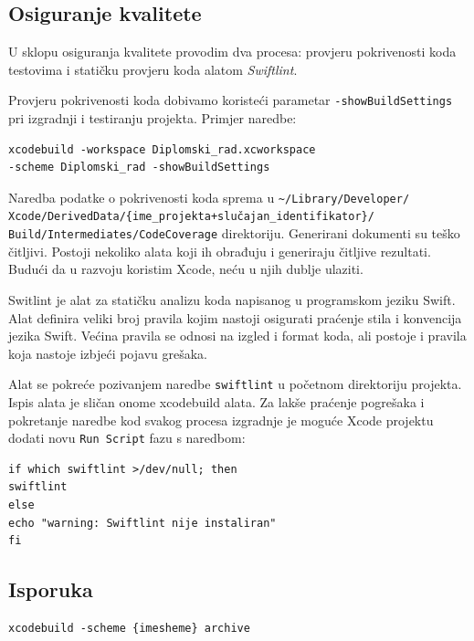 \documentclass[times, utf8, diplomski, numeric]{fer}
\begin{document}
\begin{appendices}
\subsection{Osiguranje kvalitete} \label{OsiguranjeKvaliteteImplementacija}

U sklopu osiguranja kvalitete provodim dva procesa: provjeru pokrivenosti koda testovima i statičku provjeru koda alatom \textit{Swiftlint}.

Provjeru pokrivenosti koda dobivamo koristeći parametar \verb|-showBuildSettings| pri izgradnji i testiranju projekta. Primjer naredbe:

\begin{verbatim}
xcodebuild -workspace Diplomski_rad.xcworkspace
-scheme Diplomski_rad -showBuildSettings
\end{verbatim}

Naredba podatke o pokrivenosti koda sprema u \verb|~/Library/Developer/|\\\verb|Xcode/DerivedData/{ime_projekta+slučajan_identifikator}/|\\\verb|Build/Intermediates/CodeCoverage| direktoriju. Generirani dokumenti su teško čitljivi. Postoji nekoliko alata koji ih obrađuju i generiraju čitljive rezultati. Budući da u razvoju koristim Xcode, neću u njih dublje ulaziti.

Switlint je alat za statičku analizu koda napisanog u programskom jeziku Swift. Alat definira veliki broj pravila kojim nastoji osigurati praćenje stila i konvencija jezika Swift. Većina pravila se odnosi na izgled i format koda, ali postoje i pravila koja nastoje izbjeći pojavu grešaka.

Alat se pokreće pozivanjem naredbe \verb|swiftlint| u početnom direktoriju projekta. Ispis alata je sličan onome xcodebuild alata. Za lakše praćenje pogrešaka i pokretanje naredbe kod svakog procesa izgradnje je moguće Xcode projektu dodati novu \verb|Run Script| fazu s naredbom:

\begin{verbatim}
if which swiftlint >/dev/null; then
swiftlint
else
echo "warning: Swiftlint nije instaliran"
fi
\end{verbatim}

\subsection{Isporuka}

\begin{verbatim}
xcodebuild -scheme {imesheme} archive
\end{verbatim}


\end{appendices}
\end{document}
